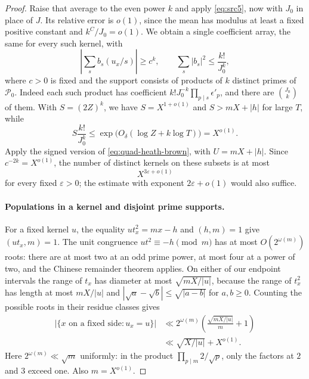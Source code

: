 \begin{proof}
Raise that average to the even power $k$ and apply
\eqref{eq:src5}, now with $J_0$ in place of $J$.
Its relative error is $o(1)$, since the mean has modulus at least a
fixed positive constant and $k^C/J_0=o(1)$.
We obtain a single coefficient array, the same for every such kernel,
with
\[
 \left|\sum_s b_s(u_x/s)\right|\geq c^k,\qquad
 \sum_s|b_s|^2\leq\frac{k!}{J_0^k},
\]
where $c>0$ is fixed and the support consists of products of $k$
distinct primes of $\mathcal P_0$.
Indeed each such product has coefficient
$k!J_0^{-k}\prod_{p\mid s}\epsilon'_p$, and there are
$\binom{J_0}{k}$ of them.
With $S=(2Z)^k$, we have $S=X^{1+o(1)}$ and
$S>mX+|h|$ for large $T$, while
\begin{equation}\label{eq:quad-coefficient-budget}
 S\frac{k!}{J_0^k}
 \leq\exp\bigl(O_\delta(\log Z+k\log T)\bigr)=X^{o(1)}.
\end{equation}
Apply the signed version of \eqref{eq:quad-heath-brown}, with
$U=mX+|h|$.  Since $c^{-2k}=X^{o(1)}$, the number of distinct
kernels on these subsets is at most
\begin{equation}\label{eq:quad-kernel-count}
 X^{3\varepsilon+o(1)}
\end{equation}
for every fixed $\varepsilon>0$; the estimate with exponent
$2\varepsilon+o(1)$ would also suffice.

\paragraph{Populations in a kernel and disjoint prime supports.}
For a fixed kernel $u$, the equality $ut_x^2=mx-h$ and
$(h,m)=1$ give $(ut_x,m)=1$.
The unit congruence $ut^2\equiv-h\pmod m$ has at most
$O(2^{\omega(m)})$ roots: there are at most two at an odd prime
power, at most four at a power of two, and the Chinese remainder
theorem applies.  On either of our endpoint intervals the range of
$t_x$ has diameter at most $\sqrt{mX/|u|}$, because the range of
$t_x^2$ has length at most $mX/|u|$ and
$|\sqrt a-\sqrt b|\leq\sqrt{|a-b|}$ for $a,b\geq0$.
Counting the possible roots in their residue classes gives
\begin{equation}\label{eq:src14}
 \begin{aligned}
 |\{x\text{ on a fixed side}:u_x=u\}|
 &\ll 2^{\omega(m)}\left(\frac{\sqrt{mX/|u|}}m+1\right)\\
 &\ll\sqrt{X/|u|}+X^{o(1)}.
 \end{aligned}
\end{equation}
Here $2^{\omega(m)}\ll\sqrt m$ uniformly: in the product
$\prod_{p\mid m}2/\sqrt p$, only the factors at $2$ and $3$ exceed
one.  Also $m=X^{o(1)}$.


\end{proof}
